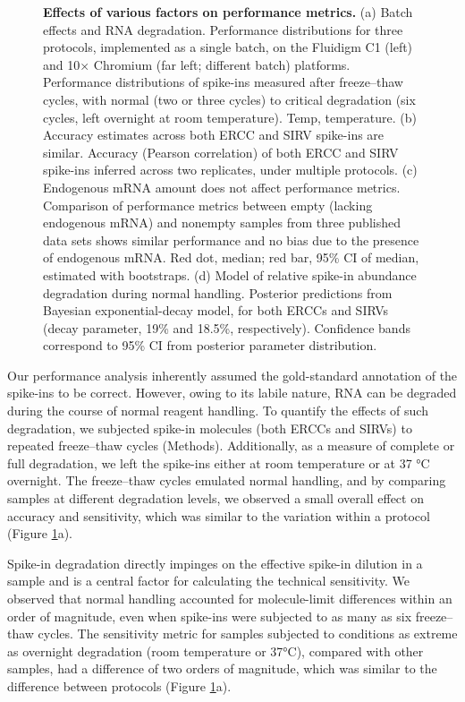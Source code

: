 \begin{figure}
    \caption[Effects of various factors on performance metrics]{\textbf{Effects of various factors on performance metrics.} (a) Batch effects and RNA degradation. Performance distributions for three protocols, implemented as a single batch, on the Fluidigm C1 (left) and 10× Chromium (far left; different batch) platforms. Performance distributions of spike-ins measured after freeze–thaw cycles, with normal (two or three cycles) to critical degradation (six cycles, left overnight at room temperature). Temp, temperature. (b) Accuracy estimates across both ERCC and SIRV spike-ins are similar. Accuracy (Pearson correlation) of both ERCC and SIRV spike-ins inferred across two replicates, under multiple protocols. (c) Endogenous mRNA amount does not affect performance metrics. Comparison of performance metrics between empty (lacking endogenous mRNA) and nonempty samples from three published data sets shows similar performance and no bias due to the presence of endogenous mRNA. Red dot, median; red bar, 95\% CI of median, estimated with bootstraps. (d) Model of relative spike-in abundance degradation during normal handling. Posterior predictions from Bayesian exponential-decay model, for both ERCCs and SIRVs (decay parameter, 19\% and 18.5\%, respectively). Confidence bands correspond to 95\% CI from posterior parameter distribution.}
    \label{fig:alternative-factors}
\end{figure}

Our performance analysis inherently assumed the gold-standard annotation of the spike-ins to be correct. However, owing to its labile nature, RNA can be degraded during the course of normal reagent handling. To quantify the effects of such degradation, we subjected spike-in molecules (both ERCCs and SIRVs) to repeated freeze–thaw cycles (Methods). Additionally, as a measure of complete or full degradation, we left the spike-ins either at room temperature or at 37 °C overnight. The freeze–thaw cycles emulated normal handling, and by comparing samples at different degradation levels, we observed a small overall effect on accuracy and sensitivity, which was similar to the variation within a protocol (Figure \ref{fig:alternative-factors}a).

Spike-in degradation directly impinges on the effective spike-in dilution in a sample and is a central factor for calculating the technical sensitivity. We observed that normal handling accounted for molecule-limit differences within an order of magnitude, even when spike-ins were subjected to as many as six freeze–thaw cycles. The sensitivity metric for samples subjected to conditions as extreme as overnight degradation (room temperature or 37°C), compared with other samples, had a difference of two orders of magnitude, which was similar to the difference between protocols (Figure \ref{fig:alternative-factors}a).

